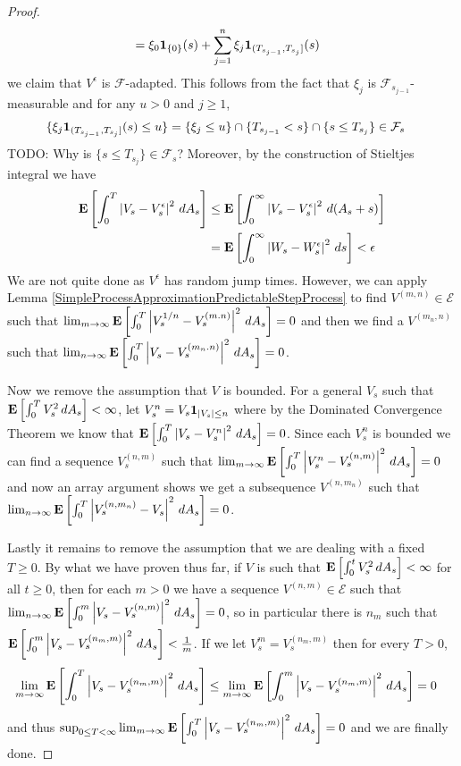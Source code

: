 \begin{proof}
\begin{align*}
&=\xi_0 \textbf{1}_{\lbrace 0 \rbrace}(s) + \sum_{j=1}^n \xi_j \textbf{1}_{(T_{s_{j-1}}, T_{s_j}]}(s) 
\end{align*}
we claim that $V^\epsilon$ is $\mathcal{F}$-adapted.  This follows from the fact that $\xi_j$ is $\mathcal{F}_{s_{j-1}}$-measurable and for any $u > 0$ and $j \geq 1$, 
\begin{align*}
\lbrace \xi_j \textbf{1}_{(T_{s_{j-1}}, T_{s_j}]}(s) \leq u \rbrace &= \lbrace \xi_j \leq u \rbrace \cap \lbrace T_{s_{j-1}} < s \rbrace \cap \lbrace s \leq T_{s_j}  \rbrace \in \mathcal{F}_s
\end{align*}
TODO: Why is $\lbrace s \leq T_{s_j}  \rbrace \in \mathcal{F}_s$?
Moreover, by the construction of Stieltjes integral we have
\begin{align*}
\textbf{E}\left[\int_0^T \left \vert V_s - V^\epsilon_s \right \vert^2 \, dA_s\right] &\leq \textbf{E}\left[\int_0^\infty \left \vert V_s - V^\epsilon_s \right \vert^2 \, d(A_s + s)\right] \\
&=\textbf{E}\left[\int_0^\infty \left \vert W_s - W^\epsilon_s \right \vert^2 \, ds\right] < \epsilon
\end{align*}
 We are not quite done as $V^\epsilon$ has random jump times.  However, we can apply Lemma \ref{SimpleProcessApproximationPredictableStepProcess} to find $V^{(m,n)} \in \mathcal{E}$ such that $\lim_{m \to \infty} \textbf{E}\left[\int_0^T \left \vert V^{1/n}_s -V^{(m.n)}_s \right \vert^2 \, dA_s\right] = 0$ and then we find a $V^{(m_n,n)}$ such that $\lim_{n \to \infty} \textbf{E}\left[\int_0^T \left \vert V_s -V^{(m_n.n)}_s \right \vert^2 \, dA_s\right] = 0$.

Now we remove the assumption that $V$ is bounded.  For a general $V_s$ such that $\textbf{E}\left[ \int_0^T V_s^2 \, dA_s\right] < \infty$, let $V^n_s = V_s \textbf{1}_{\left \vert V_s \right \vert \leq n}$ where by the Dominated Convergence Theorem we know that $\textbf{E}\left[ \int_0^T \left \vert V_s - V_s^n \right \vert^2 \, dA_s\right] = 0$.  Since each $V_s^n$ is bounded we can find a sequence $V^{(n,m)}_s$ such that $\lim_{m \to \infty} \textbf{E}\left[ \int_0^T \left \vert V^n_s - V_s^{(n,m)} \right \vert^2 \, dA_s\right] = 0$ and now an array argument shows we get a subsequence $V^{(n,m_n)}$ such that $\lim_{n \to \infty} \textbf{E}\left[ \int_0^T \left \vert V^{(n,m_n)}_s - V_s \right \vert^2 \, dA_s\right] = 0$.


Lastly it remains to remove the assumption that we are dealing with a fixed $T \geq 0$.  By what we have proven thus far, if $V$ is such that $\textbf{E}\left[ \int_0^t V_s^2 \, dA_s\right] < \infty$ for all $t \geq 0$, then for each $m > 0$ we have a sequence $V^{(n,m)} \in \mathcal{E}$ such that $\lim_{n \to \infty} \textbf{E}\left[\int_0^m \left \vert V_s - V^{(n,m)}_s \right \vert^2 \, dA_s\right] = 0$, so in particular there is $n_m$ such that $\textbf{E}\left[\int_0^m \left \vert V_s - V^{(n_m,m)}_s \right \vert^2 \, dA_s\right] < \frac{1}{m}$.  If we let $V_s^m = V_s^{(n_m,m)}$ then
for every $T > 0$, 
\begin{align*}
\lim_{m \to \infty} \textbf{E}\left[\int_0^T \left \vert V_s - V^{(n_m,m)}_s \right \vert^2 \, dA_s\right] &\leq \lim_{m \to \infty} \textbf{E}\left[\int_0^m \left \vert V_s - V^{(n_m,m)}_s \right \vert^2 \, dA_s\right] = 0
\end{align*}
and thus $\sup_{0 \leq T < \infty} \lim_{m \to \infty} \textbf{E}\left[\int_0^T \left \vert V_s - V^{(n_m,m)}_s \right \vert^2 \, dA_s\right] = 0$ and we are finally done.
\end{proof}

